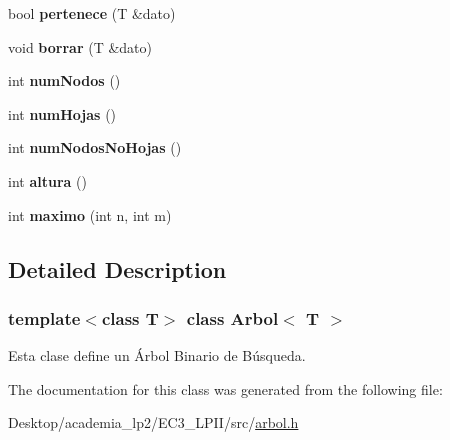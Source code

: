 \begin{CompactItemize}
\item 
\hypertarget{classArbol_315fc4e5ad1b7940acda871feadc82c0}{
bool \textbf{pertenece} (T \&dato)}
\label{classArbol_315fc4e5ad1b7940acda871feadc82c0}

\item 
\hypertarget{classArbol_8a14a3c40b5280a03fc17a24f5f005dd}{
void \textbf{borrar} (T \&dato)}
\label{classArbol_8a14a3c40b5280a03fc17a24f5f005dd}

\item 
\hypertarget{classArbol_b45032ed929d7b2ea5d0860fb318d944}{
int \textbf{numNodos} ()}
\label{classArbol_b45032ed929d7b2ea5d0860fb318d944}

\item 
\hypertarget{classArbol_2b86fa8d1632daa86c9302e16c0a7fd0}{
int \textbf{numHojas} ()}
\label{classArbol_2b86fa8d1632daa86c9302e16c0a7fd0}

\item 
\hypertarget{classArbol_08dc2d243b213fe87a8972d60704b398}{
int \textbf{numNodosNoHojas} ()}
\label{classArbol_08dc2d243b213fe87a8972d60704b398}

\item 
\hypertarget{classArbol_f1e00998d1764ccc5eb998419855338c}{
int \textbf{altura} ()}
\label{classArbol_f1e00998d1764ccc5eb998419855338c}

\item 
\hypertarget{classArbol_079dfb7fbda3ce6bc7c584830948ec55}{
int \textbf{maximo} (int n, int m)}
\label{classArbol_079dfb7fbda3ce6bc7c584830948ec55}

\end{CompactItemize}


\subsection{Detailed Description}
\subsubsection*{template$<$class T$>$ class Arbol$<$ T $>$}

Esta clase define un Árbol Binario de Búsqueda. 

The documentation for this class was generated from the following file:\begin{CompactItemize}
\item 
Desktop/academia\_\-lp2/EC3\_\-LPII/src/\hyperlink{arbol_8h}{arbol.h}\end{CompactItemize}
